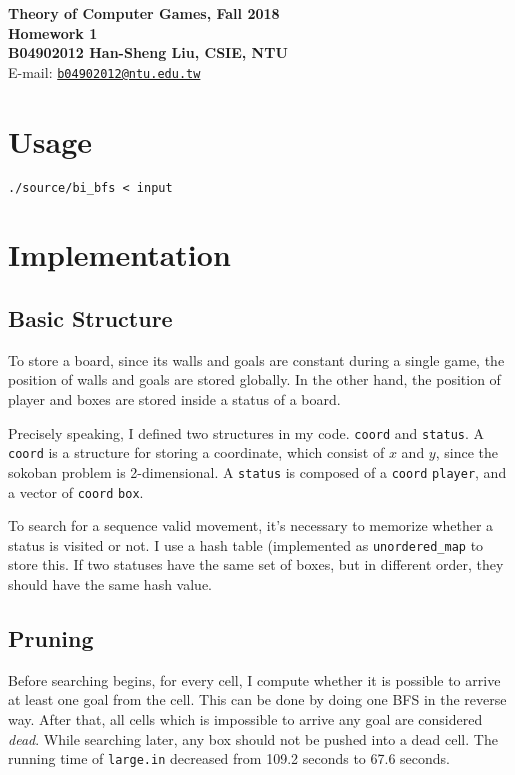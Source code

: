 \documentclass[12pt,a4paper]{article}
\begin{document}
\begin{center}
\textbf{\Large Theory of Computer Games, Fall 2018\\}
\textbf{\Large Homework 1\\} 
\vspace{5pt}
\textbf{B04902012 Han-Sheng Liu, CSIE, NTU}\\
E-mail: \href{mailto:b04902012@ntu.edu.tw}{\texttt{b04902012@ntu.edu.tw}}\\

\end{center}
\vspace{5pt}
\section{Usage}
\texttt{./source/bi\_bfs < input}
\section{Implementation}
    \subsection{Basic Structure}
    To store a board, since its walls and goals are constant during a single game, the position of walls and goals are stored globally. In the other hand, the position of player and boxes are stored inside a status of a board.

    Precisely speaking, I defined two structures in my code. \texttt{coord} and \texttt{status}. A \texttt{coord} is a structure for storing a coordinate, which consist of $x$ and $y$, since the sokoban problem is 2-dimensional. A \texttt{status} is composed of a \texttt{coord} \texttt{player}, and a vector of \texttt{coord} \texttt{box}.

    To search for a sequence valid movement, it's necessary to memorize whether a status is visited or not. I use a hash table (implemented as \texttt{unordered\_map} to store this. If two statuses have the same set of boxes, but in different order, they should have the same hash value.

    \subsection{Pruning}
    Before searching begins, for every cell, I compute whether it is possible to arrive at least one goal from the cell. This can be done by doing one BFS in the reverse way. After that, all cells which is impossible to arrive any goal are considered \textit{dead}. While searching later, any box should not be pushed into a dead cell. The running time of \texttt{large.in} decreased from 109.2 seconds to 67.6 seconds.
\end{document}
